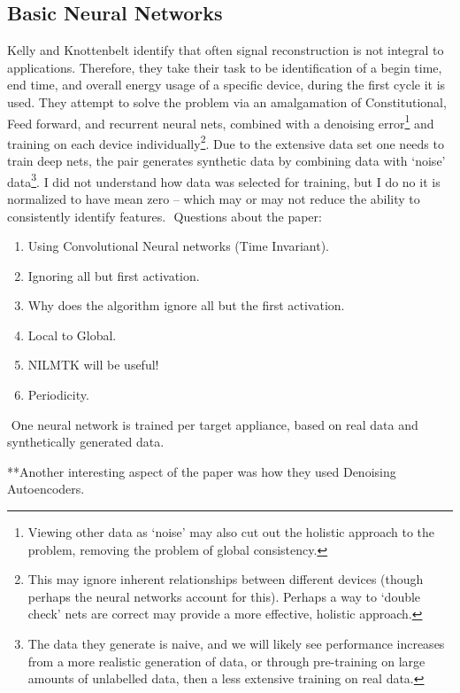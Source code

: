 \documentclass{article}
\begin{document}
\subsection{Basic Neural Networks}

Kelly and Knottenbelt identify that often signal reconstruction is not integral to applications.
Therefore, they take their task to be identification of a begin time, end time, and overall energy usage of a specific device, during the first cycle it is used.
They attempt to solve the problem via an amalgamation of Constitutional, Feed forward, and recurrent neural nets, combined with a denoising error\footnote{Viewing other data as `noise' may also cut out the holistic approach to the problem, removing the problem of global consistency.} and training on each device individually\footnote{This may ignore inherent relationships between different devices (though perhaps the neural networks account for this).
Perhaps a way to `double check' nets are correct may provide a more effective, holistic approach.}.
Due to the extensive data set one needs to train deep nets, the pair generates synthetic data by combining data with `noise' data\footnote{The data they generate is naive, and we will likely see performance increases from a more realistic generation of data, or through pre-training on large amounts of unlabelled data, then a less extensive training on real data.}.
I did not understand how data was selected for training, but I do no it is normalized to have mean zero -- which may or may not reduce the ability to consistently identify features.
​
Questions about the paper:
%
\begin{enumerate}
	\item Using Convolutional Neural networks (Time Invariant).
	\item Ignoring all but first activation.
	\item Why does the algorithm ignore all but the first activation.
	\item Local to Global.
	\item NILMTK will be useful!
	\item Periodicity.
\end{enumerate}
​
One neural network is trained per target appliance, based on real data and synthetically generated data.

**Another interesting aspect of the paper was how they used Denoising Autoencoders.
​
\end{document}
